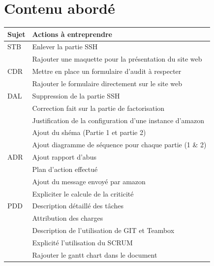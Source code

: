 \documentclass[a4paper,11pt,french]{article}
\begin{document}
\section{Contenu abordé}
\begin{center}

\begin{tabular}{ | l | p{15cm} |}
	\hline
   \textbf{Sujet} & \textbf{Actions à entreprendre}    \\ \hline
 STB & Enlever la partie SSH \\ 
 & Rajouter une maquette pour la présentation du site web \\ \hline
CDR &  Mettre en place un formulaire d'audit à respecter \\
&  Rajouter le formulaire directement sur le site web \\ \hline
DAL & Suppression de la partie SSH\\
	& Correction fait sur la partie de factorisation \\
	& Justification de la configuration d'une instance d'amazon\\
	&  Ajout du shéma (Partie 1 et partie 2) \\
	&  Ajout diagramme de séquence pour chaque partie (1 \& 2) \\ \hline
ADR	& Ajout rapport d'abus\\
&  Plan d'action effectué \\
&  Ajout du message envoyé par amazon  \\
&  Expliciter le calcule de la criticité \\ \hline
PDD & Description détaillé des tâches\\
 & Attribution des charges\\
 & Description de l'utilisation de GIT et Teambox \\
 & Explicité l'utilisation du SCRUM \\
 & Rajouter le gantt chart dans le document\\ \hline
 \end{tabular}
 
\end{center}
\end{document}
